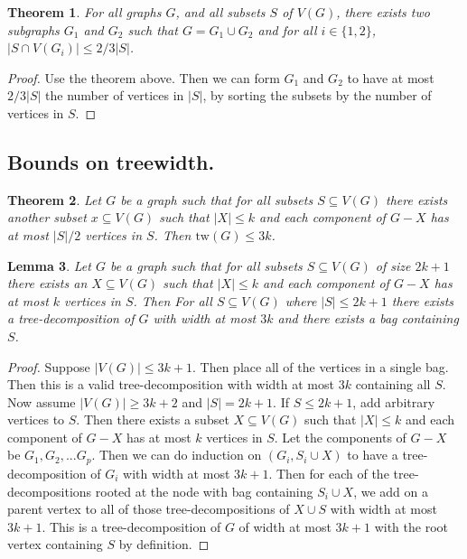 \documentclass[]{article}
\newcommand{\tw}{\text{tw}}
\newtheorem{theorem}{Theorem}
\newtheorem{lemma}[theorem]{Lemma}
\theoremstyle{definition}
\numberwithin{theorem}{section}
\numberwithin{equation}{section}
\begin{document}
\begin{theorem}
	For all graphs $G$, and all subsets $S$ of $V(G)$, there exists  two subgraphs $G_1$ and $G_2$ such that $G = G_1 \cup G_2$ and for all $i \in \lbrace 1, 2 \rbrace$, $|S \cap V(G_i) | \leq 2/3 |S|$.
\end{theorem}
\begin{proof}
	Use the theorem above. Then we can form $G_1$ and $G_2$ to have at most $2/3 |S|$ the number of vertices in $|S|$, by sorting the subsets by the number of vertices in $S$. 
\end{proof}

\subsection{Bounds on treewidth.}
\begin{theorem}
	Let $G$ be a graph such that for all subsets $S \subseteq V(G)$ there exists another subset $x \subseteq V(G)$ such that $|X| \leq k$ and each component of $G - X$ has at most $|S|/2$ vertices in $S$. Then $\tw(G) \leq 3k$. 
\end{theorem}

\begin{lemma}
	Let $G$ be a graph such that for all subsets $S \subseteq V(G)$ of size $2k + 1$ there exists an $X \subseteq V(G)$ such that $|X| \leq k$ and each component of $G - X$ has at most $k$ vertices in $S$. Then For all $S \subseteq V(G)$ where $|S| \leq 2k+1$ there exists a tree-decomposition of $G$ with width at most $3k$ and there exists a bag containing $S$. 
\end{lemma}
\begin{proof}
	Suppose $|V(G)| \leq 3k + 1$. Then place all of the vertices in a single bag. Then this is a valid tree-decomposition with width at most $3k$ containing all $S$. 
	Now assume $|V(G)| \geq 3k + 2$ and $|S| = 2k + 1$. If $S \leq 2k + 1$, add arbitrary vertices to $S$. Then there exists a subset $X \subseteq V(G)$ such that $|X| \leq k$ and each component of $G - X$ has at most $k$ vertices in $S$. Let the components of $G - X$ be $G_1, G_2, ... G_p$. Then we can do induction on $(G_i, S_i \cup X)$ to have a tree-decomposition of $G_i$ with width at most $3k + 1$. Then for each of the tree-decompositions rooted at the node with bag containing $S_i \cup X$, we add on a parent vertex to all of those tree-decompositions of $X \cup S$ with width at most $3k + 1$.  This is a tree-decomposition of $G$ of width at most $3k + 1$ with the root vertex containing $S$ by definition. 
\end{proof}
\end{document}
